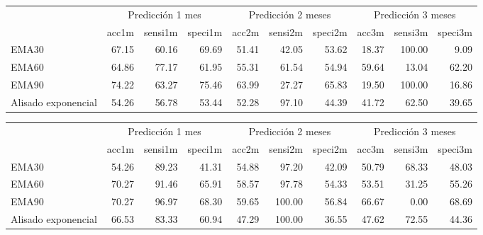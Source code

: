 \documentclass[]{DissertateUSU}
\begin{document}
\setlength\parskip{5ex}

\begin{table}[H]
\centering\begingroup\fontsize{10}{12}\selectfont

\begin{tabular}{l|r|r|r|r|r|r|r|r|r}
\hline
\multicolumn{1}{c|}{ } & \multicolumn{3}{c|}{Predicción 1 mes} & \multicolumn{3}{c|}{Predicción 2 meses} & \multicolumn{3}{c}{Predicción 3 meses} \\
\cline{2-4} \cline{5-7} \cline{8-10}
  & acc1m & sensi1m & speci1m & acc2m & sensi2m & speci2m & acc3m & sensi3m & speci3m\\
\hline
EMA30 & 67.15 & 60.16 & 69.69 & 51.41 & 42.05 & 53.62 & 18.37 & 100.00 & 9.09\\
\hline
EMA60 & 64.86 & 77.17 & 61.95 & 55.31 & 61.54 & 54.94 & 59.64 & 13.04 & 62.20\\
\hline
EMA90 & 74.22 & 63.27 & 75.46 & 63.99 & 27.27 & 65.83 & 19.50 & 100.00 & 16.86\\
\hline
Alisado exponencial & 54.26 & 56.78 & 53.44 & 52.28 & 97.10 & 44.39 & 41.72 & 62.50 & 39.65\\
\hline
\end{tabular}
\endgroup{}
\end{table}

\setlength\parskip{5ex}

\begin{table}[H]
\centering\begingroup\fontsize{10}{12}\selectfont

\begin{tabular}{l|r|r|r|r|r|r|r|r|r}
\hline
\multicolumn{1}{c|}{ } & \multicolumn{3}{c|}{Predicción 1 mes} & \multicolumn{3}{c|}{Predicción 2 meses} & \multicolumn{3}{c}{Predicción 3 meses} \\
\cline{2-4} \cline{5-7} \cline{8-10}
  & acc1m & sensi1m & speci1m & acc2m & sensi2m & speci2m & acc3m & sensi3m & speci3m\\
\hline
EMA30 & 54.26 & 89.23 & 41.31 & 54.88 & 97.20 & 42.09 & 50.79 & 68.33 & 48.03\\
\hline
EMA60 & 70.27 & 91.46 & 65.91 & 58.57 & 97.78 & 54.33 & 53.51 & 31.25 & 55.26\\
\hline
EMA90 & 70.27 & 96.97 & 68.30 & 59.65 & 100.00 & 56.84 & 66.67 & 0.00 & 68.69\\
\hline
Alisado exponencial & 66.53 & 83.33 & 60.94 & 47.29 & 100.00 & 36.55 & 47.62 & 72.55 & 44.36\\
\hline
\end{tabular}
\endgroup{}
\end{table}
\end{document}
